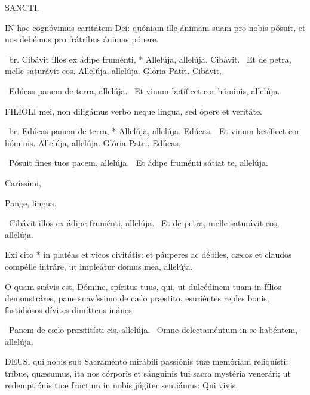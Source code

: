  \lettrine[lines=2]{S}{ANCTI}. 



\lettrine[lines=2]{I}{N} hoc cognóvimus caritátem Dei: quóniam ille ánimam suam pro nobis pósuit, et nos debémus pro frátribus ánimas pónere.

\R\ br. Cibávit illos ex ádipe fruménti, * Allelúja, allelúja. Cibávit. \V\ Et de petra, melle saturávit eos. Allelúja, allelúja. Glória Patri. Cibávit.

\V\ Edúcas panem de terra, allelúja. \R\ Et vinum lætíficet cor hóminis, allelúja.



\lettrine[lines=2]{F}{ILIOLI} mei, non diligámus verbo neque lingua, sed ópere et veritáte.

\R\ br. Edúcas panem de terra, * Allelúja, allelúja. Edúcas. \V\ Et vinum lætíficet cor hóminis. Allelúja, allelúja. Glória Patri. Edúcas.

\V\ Pósuit fines tuos pacem, allelúja. \R\ Et ádipe fruménti sátiat te, allelúja.



 Caríssimi, 

 Pange, lingua, 

\V\ Cibávit illos ex ádipe fruménti, allelúja. \R\ Et de petra, melle saturávit eos, allelúja.

 Exi cito * in platéas et vicos civitátis: et páuperes ac débiles, cæcos et claudos compélle intráre, ut impleátur domus mea, allelúja.


 O quam suávis est, Dómine, spíritus tuus, qui, ut dulcédinem tuam in fílios demonstráres, pane suavíssimo de cælo præstito, esuriéntes reples bonis, fastidiósos dívites dimíttens inánes.

\V\ Panem de cælo præstitísti eis, allelúja. \R\ Omne delectaméntum in se habéntem, allelúja.


\lettrine[lines=2]{D}{EUS}, qui nobis sub Sacraménto mirábili passiónis tuæ memóriam reliquísti: tríbue, quæsumus, ita nos córporis et sánguinis tui sacra mystéria venerári; ut redemptiónis tuæ fructum in nobis júgiter sentiámus: Qui vivis.

